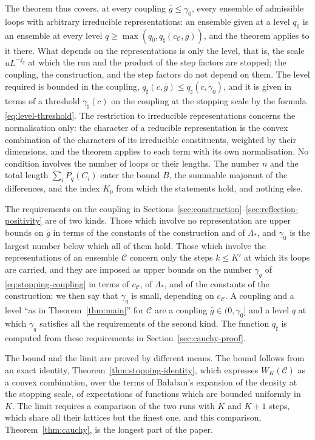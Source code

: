 \documentclass[11pt]{preprint}
\numberwithin{equation}{section}
\theoremstyle{definition}
\theoremstyle{remark}
\theoremstyle{plain}
\begin{document}
The theorem thus covers, at every coupling $\bar g \leq \gamma_0$, every ensemble of admissible loops with arbitrary irreducible representations: an ensemble given at a level $q_0$ is an ensemble at every level $q \geq \max(q_0, q_\sharp(c_{\mathcal C}, \bar g))$, and the theorem applies to it there. What depends on the representations is only the level, that is, the scale $uL^{-j_q}$ at which the run and the product of the step factors are stopped; the coupling, the construction, and the step factors do not depend on them. The level required is bounded in the coupling, $q_\sharp(c, \bar g) \leq q_\sharp(c, \gamma_0)$, and it is given in terms of a threshold $\gamma_\sharp(c)$ on the coupling at the stopping scale by the formula \eqref{eq:level-threshold}. The restriction to irreducible representations concerns the normalisation only: the character of a reducible representation is the convex combination of the characters of its irreducible constituents, weighted by their dimensions, and the theorem applies to each term with its own normalisation. No condition involves the number of loops or their lengths. The number $n$ and the total length $\sum_iP_q(C_i)$ enter the bound $B$, the summable majorant of the differences, and the index $K_0$ from which the statements hold, and nothing else.

The requirements on the coupling in Sections~\ref{sec:construction}--\ref{sec:reflection-positivity} are of two kinds. Those which involve no representation are upper bounds on $\bar g$ in terms of the constants of the construction and of $\Lambda_*$, and $\gamma_0$ is the largest number below which all of them hold. Those which involve the representations of an ensemble $\mathcal C$ concern only the steps $k \leq K'$ at which its loops are carried, and they are imposed as upper bounds on the number $\gamma_q$ of \eqref{eq:stopping-coupling} in terms of $c_{\mathcal C}$, of $\Lambda_*$, and of the constants of the construction; we then say that $\gamma_q$ is small, depending on $c_{\mathcal C}$. A coupling and a level ``as in Theorem~\ref{thm:main}'' for $\mathcal C$ are a coupling $\bar g \in (0, \gamma_0]$ and a level $q$ at which $\gamma_q$ satisfies all the requirements of the second kind. The function $q_\sharp$ is computed from these requirements in Section~\ref{sec:cauchy-proof}.

The bound and the limit are proved by different means. The bound follows from an exact identity, Theorem~\ref{thm:stopping-identity}, which expresses $W_K(\mathcal C)$ as a convex combination, over the terms of Ba{\l}aban's expansion of the density at the stopping scale, of expectations of functions which are bounded uniformly in $K$. The limit requires a comparison of the two runs with $K$ and $K + 1$ steps, which share all their lattices but the finest one, and this comparison, Theorem~\ref{thm:cauchy}, is the longest part of the paper.
\end{document}
